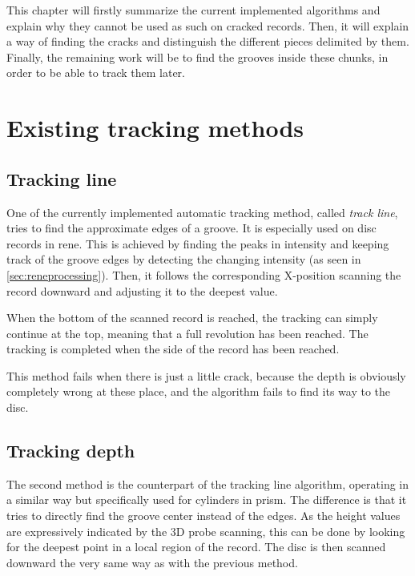 This chapter will firstly summarize the current implemented algorithms and explain why they cannot be used as such on cracked records. Then, it will explain a way of finding the cracks and distinguish the different pieces delimited by them. Finally, the remaining work will be to find the grooves inside these chunks, in order to be able to track them later.

\section{Existing tracking methods}
\label{sec:trackmethods}

\subsection{Tracking line}

One of the currently implemented automatic tracking method, called \emph{track line}, tries to find the approximate edges of a groove. It is especially used on disc records in \gls{rene}. This is achieved by finding the peaks in intensity and keeping track of the groove edges by detecting the changing intensity (as seen in \autoref{sec:reneprocessing}). Then, it follows the corresponding X-position scanning the record downward and adjusting it to the deepest value.

When the bottom of the scanned record is reached, the tracking can simply continue at the top, meaning that a full revolution has been reached. The tracking is completed when the side of the record has been reached.

This method fails when there is just a little crack, because the depth is obviously completely wrong at these place, and the algorithm fails to find its way to the disc.

\subsection{Tracking depth}

The second method is the counterpart of the tracking line algorithm, operating in a similar way but specifically used for cylinders in \gls{prism}. The difference is that it tries to directly find the groove center instead of the edges. As the height values are expressively indicated by the 3D probe scanning, this can be done by looking for the deepest point in a local region of the record. The disc is then scanned downward the very same way as with the previous method.

